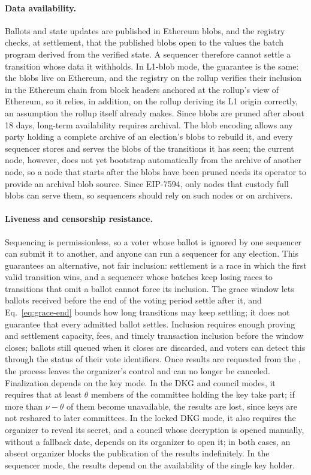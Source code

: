 \paragraph{Data availability.} Ballots and state updates are published in Ethereum blobs, and the registry checks, at settlement, that the published blobs open to the values the batch program derived from the verified state. A sequencer therefore cannot settle a transition whose data it withholds. In L1-blob mode, the guarantee is the same: the blobs live on Ethereum, and the registry on the rollup verifies their inclusion in the Ethereum chain from block headers anchored at the rollup's view of Ethereum, so it relies, in addition, on the rollup deriving its L1 origin correctly, an assumption the rollup itself already makes. Since blobs are pruned after about 18 days, long-term availability requires archival. The blob encoding allows any party holding a complete archive of an election's blobs to rebuild it, and every sequencer stores and serves the blobs of the transitions it has seen; the current node, however, does not yet bootstrap automatically from the archive of another node, so a node that starts after the blobs have been pruned needs its operator to provide an archival blob source. Since EIP-7594, only nodes that custody full blobs can serve them, so sequencers should rely on such nodes or on archivers.

\paragraph{Liveness and censorship resistance.} Sequencing is permissionless, so a voter whose ballot is ignored by one sequencer can submit it to another, and anyone can run a sequencer for any election. This guarantees an alternative, not fair inclusion: settlement is a race in which the first valid transition wins, and a sequencer whose batches keep losing races to transitions that omit a ballot cannot force its inclusion. The grace window lets ballots received before the end of the voting period settle after it, and Eq.~\eqref{eq:grace-end} bounds how long transitions may keep settling; it does not guarantee that every admitted ballot settles. Inclusion requires enough proving and settlement capacity, fees, and timely transaction inclusion before the window closes; ballots still queued when it closes are discarded, and voters can detect this through the status of their vote identifiers. Once results are requested from the \keywardens, the process leaves the organizer's control and can no longer be canceled. Finalization depends on the key mode. In the \ac{DKG} and council modes, it requires that at least $\theta$ members of the committee holding the key take part; if more than $\nu - \theta$ of them become unavailable, the results are lost, since keys are not reshared to later committees. In the locked \ac{DKG} mode, it also requires the organizer to reveal its secret, and a council whose decryption is opened manually, without a fallback date, depends on its organizer to open it; in both cases, an absent organizer blocks the publication of the results indefinitely. In the sequencer mode, the results depend on the availability of the single key holder.

